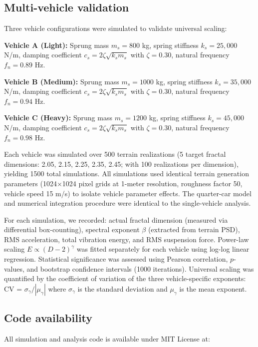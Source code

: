 \documentclass[11pt]{article}
\begin{document}
\subsection*{Multi-vehicle validation}

Three vehicle configurations were simulated to validate universal scaling:

\textbf{Vehicle A (Light):} Sprung mass $m_s = 800$ kg, spring stiffness $k_s = 25{,}000$ N/m, damping coefficient $c_s = 2\zeta\sqrt{k_s m_s}$ with $\zeta = 0.30$, natural frequency $f_n = 0.89$ Hz.

\textbf{Vehicle B (Medium):} Sprung mass $m_s = 1000$ kg, spring stiffness $k_s = 35{,}000$ N/m, damping coefficient $c_s = 2\zeta\sqrt{k_s m_s}$ with $\zeta = 0.30$, natural frequency $f_n = 0.94$ Hz.

\textbf{Vehicle C (Heavy):} Sprung mass $m_s = 1200$ kg, spring stiffness $k_s = 45{,}000$ N/m, damping coefficient $c_s = 2\zeta\sqrt{k_s m_s}$ with $\zeta = 0.30$, natural frequency $f_n = 0.98$ Hz.

Each vehicle was simulated over 500 terrain realizations (5 target fractal dimensions: 2.05, 2.15, 2.25, 2.35, 2.45; with 100 realizations per dimension), yielding 1500 total simulations. All simulations used identical terrain generation parameters (1024$\times$1024 pixel grids at 1-meter resolution, roughness factor 50, vehicle speed 15 m/s) to isolate vehicle parameter effects. The quarter-car model and numerical integration procedure were identical to the single-vehicle analysis.

For each simulation, we recorded: actual fractal dimension (measured via differential box-counting), spectral exponent $\beta$ (extracted from terrain PSD), RMS acceleration, total vibration energy, and RMS suspension force. Power-law scaling $E \propto (D-2)^\gamma$ was fitted separately for each vehicle using log-log linear regression. Statistical significance was assessed using Pearson correlation, $p$-values, and bootstrap confidence intervals (1000 iterations). Universal scaling was quantified by the coefficient of variation of the three vehicle-specific exponents: CV = $\sigma_\gamma / |\mu_\gamma|$ where $\sigma_\gamma$ is the standard deviation and $\mu_\gamma$ is the mean exponent.

\subsection*{Code availability}

All simulation and analysis code is available under MIT License at:
\end{document}
